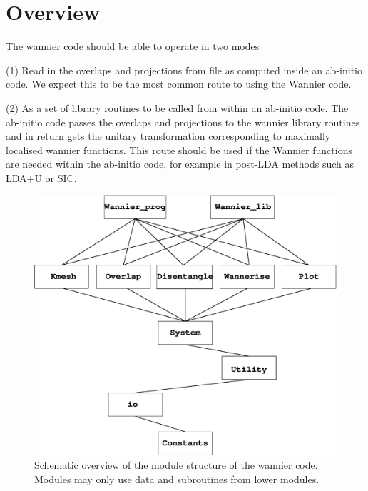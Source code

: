 \chapter{Overview}
The wannier code should be able to operate in two modes

(1) Read in the overlaps and projections from file as computed 
inside an ab-initio code. We expect this to be the most common route to using the Wannier code.


(2) As a set of library routines to be called from within an ab-initio code. 
The ab-initio code passes the overlaps and projections to the wannier library routines
and in return gets the unitary transformation corresponding to maximally localised wannier functions.
This route should be used if the Wannier functions are needed within the ab-initio code, for example
in post-LDA methods such as LDA+U or SIC.



\begin{figure}
\begin{center}
\includegraphics[width=6in]{overview.eps}
\caption{Schematic overview of the module structure of the wannier code. Modules may only use data
and subroutines from lower modules.}
\label{structure}
\end{center}
\end{figure}
